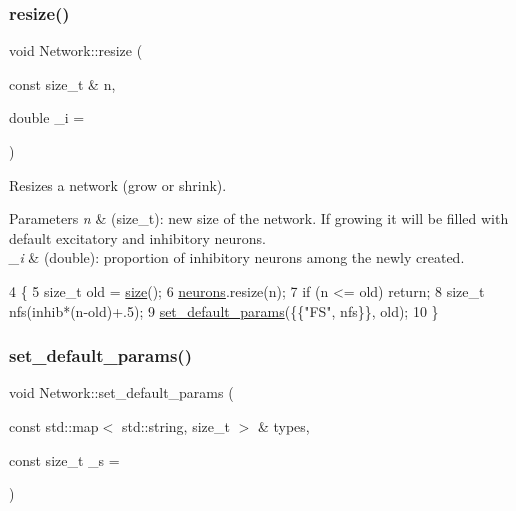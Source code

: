 \subsubsection{\texorpdfstring{resize()}{resize()}}
{\footnotesize\ttfamily void Network\+::resize (\begin{DoxyParamCaption}\item[{const size\+\_\+t \&}]{n,  }\item[{double}]{\+\_\+i = {} }\end{DoxyParamCaption})}

Resizes a network (grow or shrink). 
\begin{DoxyParams}{Parameters}
{\em n} & (size\+\_\+t)\+: new size of the network. If growing it will be filled with default excitatory and inhibitory neurons. \\
\hline
{\em \+\_\+i} & (double)\+: proportion of inhibitory neurons among the newly created. \\
\hline
\end{DoxyParams}

\begin{DoxyCode}
4                                                   \{
5     \textcolor{keywordtype}{size\_t} old = \hyperlink{classNetwork_a41c54d12d861883170b5c5abca3a7bc8}{size}();
6     \hyperlink{classNetwork_a1b7832bc2c7b8855cdc3b2d6329eff9d}{neurons}.resize(n);
7     \textcolor{keywordflow}{if} (n <= old) \textcolor{keywordflow}{return};
8     \textcolor{keywordtype}{size\_t} nfs(inhib*(n-old)+.5);
9     \hyperlink{classNetwork_ad1d20020028425cfab199da1942172c9}{set\_default\_params}(\{\{\textcolor{stringliteral}{"FS"}, nfs\}\}, old);
10 \}
\end{DoxyCode}
\mbox{\label{classNetwork_ad1d20020028425cfab199da1942172c9}} 
\subsubsection{\texorpdfstring{set\+\_\+default\+\_\+params()}{set\_default\_params()}}
{\footnotesize\ttfamily void Network\+::set\+\_\+default\+\_\+params (\begin{DoxyParamCaption}\item[{const std\+::map$<$ std\+::string, size\+\_\+t $>$ \&}]{types,  }\item[{const size\+\_\+t}]{\+\_\+s = {} }\end{DoxyParamCaption})}

